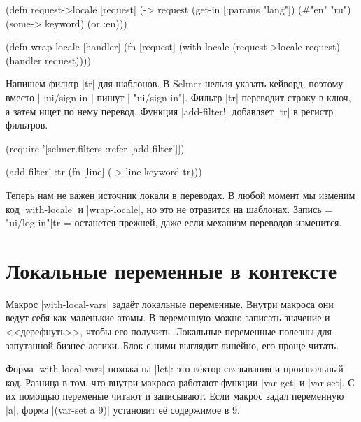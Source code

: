 \begin{english}
  \begin{clojure}
(defn request->locale [request]
  (-> request
      (get-in [:params "lang"])
      (#{"en" "ru"})
      (some-> keyword)
      (or :en)))

(defn wrap-locale [handler]
  (fn [request]
    (with-locale (request->locale request)
      (handler request))))
  \end{clojure}
\end{english}

Напишем фильтр \spverb|tr| для шаблонов. В Selmer нельзя указать кейворд,
поэтому вместо \spverb|{{ :ui/sign-in }}| пишут \spverb|{{ "ui/sign-in"}}|.
Фильтр \spverb|tr| переводит строку в ключ, а затем ищет по нему
перевод. Функция \spverb|add-filter!| добавляет \spverb|tr| в регистр фильтров.

\begin{english}
  \begin{clojure}
(require '[selmer.filters :refer [add-filter!]])

(add-filter! :tr
 (fn [line]
   (-> line keyword tr)))
  \end{clojure}
\end{english}

Теперь нам не важен источник локали в переводах. В любой момент мы изменим код
\spverb|with-locale| и \spverb|wrap-locale|, но это не отразится на
шаблонах. Запись \spverb={{ "ui/log-in"|tr }}= останется прежней, даже если
механизм переводов изменится.

\section{Локальные переменные в контексте}


Макрос \spverb|with-local-vars| зада\"{е}т локальные переменные. Внутри макроса они
ведут себя как маленькие атомы. В переменную можно записать значение и
<<дерефнуть>>, чтобы его получить. Локальные переменные полезны для запутанной
бизнес-логики. Блок с ними выглядит линейно, его проще читать.

Форма \spverb|with-local-vars| похожа на \spverb|let|: это вектор связывания и
произвольный код. Разница в том, что внутри макроса работают функции
\spverb|var-get| и \spverb|var-set|. С их помощью переменые читают и
записывают. Если макрос задал переменную \spverb|a|, форма
\spverb|(var-set a 9)| установит е\"{е} содержимое в 9.

